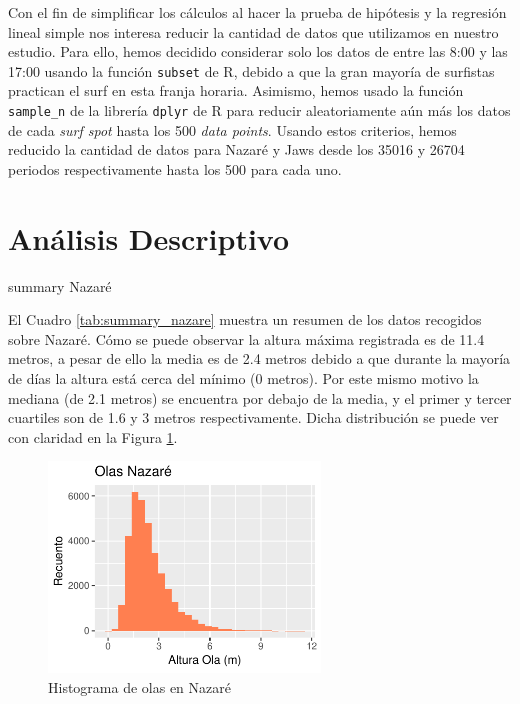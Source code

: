 Con el fin de simplificar los cálculos al hacer la prueba de hipótesis y la regresión lineal simple nos interesa reducir la cantidad de datos que utilizamos en nuestro estudio. Para ello, hemos decidido considerar solo los datos de entre las 8:00 y las 17:00 usando la función \texttt{subset} de R, debido a que la gran mayoría de surfistas practican el surf en esta franja horaria. Asimismo, hemos usado la función \texttt{sample\_n} de la librería \texttt{dplyr} de R para reducir aleatoriamente aún más los datos de cada \textit{surf spot} hasta los 500 \textit{data points}. Usando estos criterios, hemos reducido la cantidad de datos para Nazaré y Jaws desde los 35016 y 26704 periodos respectivamente hasta los 500 para cada uno.

\section{Análisis Descriptivo}%
\label{sec:metodos}

\begin{table}[htbp]
    \centering
    
    \caption{summary Nazaré}
    \label{tab:summary_nazare}
\end{table}

El Cuadro \ref{tab:summary_nazare} muestra un resumen de los datos recogidos sobre Nazaré. Cómo se puede observar la altura máxima registrada es de 11.4 metros, a pesar de ello la media es de 2.4 metros debido a que durante la mayoría de días la altura está cerca del mínimo (0 metros). Por este mismo motivo la mediana (de 2.1 metros) se encuentra por debajo de la media, y el primer y tercer cuartiles son de 1.6 y 3 metros respectivamente. Dicha distribución se puede ver con claridad en la Figura \ref{fig:hist_waves_nazare}.

\begin{figure}[H]
    \centering
    \includegraphics[height=5.6cm]{./figures/nazare_hist_wave.pdf}
    \caption{Histograma de olas en Nazaré}
    \label{fig:hist_waves_nazare}
\end{figure}

